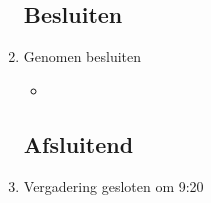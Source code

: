 \documentclass{article}
\begin{document}
\begin{enumerate}
	\subsection*{Besluiten}
	\item Genomen besluiten
	\begin{itemize}
		\item 
	\end{itemize}

	\noindent 
	\subsection*{Afsluitend}
	\item Vergadering gesloten om 9:20%

\end{enumerate}
\end{document}
